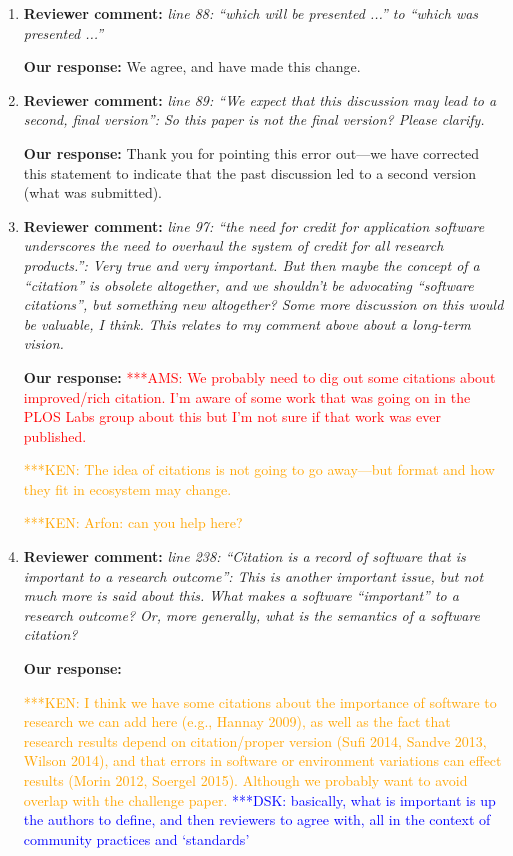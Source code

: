 \documentclass{article}
\newcommand{\katznote}[1]{ {\textcolor{blue} { ***DSK: #1 }}} %
\newcommand{\niemnote}[1]{ {\textcolor{orange} { ***KEN: #1 }}} %
\newcommand{\asnote}[1]{ {\textcolor{red} { ***AMS: #1 }}} %
\begin{document}
\begin{enumerate}
\niemnote{I will work on this, but may need help}

\item \textbf{Reviewer comment:}
\emph{line 88: ``which will be presented ...'' to ``which was presented ...''}

\textbf{Our response:}
We agree, and have made this change.


\item \textbf{Reviewer comment:}
\emph{line 89: ``We expect that this discussion may lead to a second, final version'': So this paper is not the final version? Please clarify.}

\textbf{Our response:}
Thank you for pointing this error out---we have corrected this statement to indicate that the past discussion led to a second version (what was submitted).


\item \textbf{Reviewer comment:}
\emph{line 97: ``the need for credit for application software underscores the need to overhaul the system of credit for all research products.'': Very true and very important. But then maybe the concept of a ``citation'' is obsolete altogether, and we shouldn't be advocating ``software citations'', but something new altogether? Some more discussion on this would be valuable, I think. This relates to my comment above about a long-term vision.}

\textbf{Our response:}
\asnote{We probably need to dig out some citations about improved/rich citation. I'm aware of some work that was going on in the PLOS Labs group about this but I'm not sure if that work was ever published.}

\niemnote{The idea of citations is not going to go away---but format and how they fit in ecosystem may change.}

\niemnote{Arfon: can you help here?}

\item \textbf{Reviewer comment:}
\emph{line 238: ``Citation is a record of software that is important to a research outcome'': This is another important issue, but not much more is said about this. What makes a software ``important'' to a research outcome? Or, more generally, what is the semantics of a software citation?}

\textbf{Our response:}

\niemnote{I think we have some citations about the importance of software to research we can add here (e.g., Hannay 2009), as well as the fact that research results depend on citation\slash proper version (Sufi 2014, Sandve 2013, Wilson 2014), and that errors in software or environment variations can effect results (Morin 2012, Soergel 2015). Although we probably want to avoid overlap with the challenge paper.} \katznote{basically, what is important is up the authors to define, and then reviewers to agree with, all in the context of community practices and `standards'}


\end{enumerate}
\end{document}
